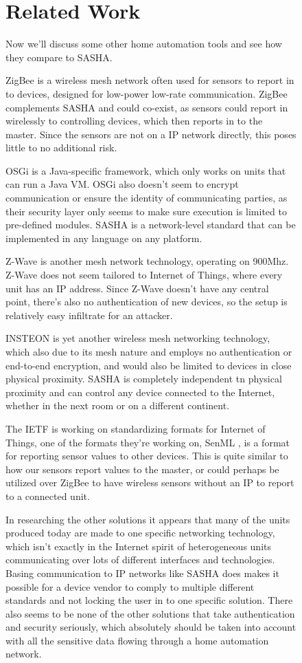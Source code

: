 \begin{figure}[H]
\section{Related Work}

Now we'll discuss some other home automation tools and see how they compare to SASHA.

ZigBee\cite{zigbee} is a wireless mesh network often used for sensors to report in to devices, designed for low-power low-rate communication. ZigBee complements SASHA and could co-exist, as sensors could report in wirelessly to controlling devices, which then reports in to the master. Since the sensors are not on a IP network directly, this poses little to no additional risk.

OSGi\cite{osgi} is a Java-specific framework, which only works on units that can run a Java VM. OSGi also doesn't seem to encrypt communication or ensure the identity of communicating parties, as their security layer only seems to make sure execution is limited to pre-defined modules. SASHA is a network-level standard that can be implemented in any language on any platform.

Z-Wave\cite{z-wave} is another mesh network technology, operating on 900Mhz. Z-Wave does not seem tailored to Internet of Things, where every unit has an IP address. Since Z-Wave doesn't have any central point, there's also no authentication of new devices, so the setup is relatively easy infiltrate for an attacker.

INSTEON is yet another wireless mesh networking technology, which also due to its mesh nature and employs no authentication or end-to-end encryption, and would also be limited to devices in close physical proximity. SASHA is completely independent tn physical proximity and can control any device connected to the Internet, whether in the next room or on a different continent.

The IETF is working on standardizing formats for Internet of Things, one of the formats they're working on, SenML \cite{senml}, is a format for reporting sensor values to other devices. This is quite similar to how our sensors report values to the master, or could perhaps be utilized over ZigBee to have wireless sensors without an IP to report to a connected unit.

In researching the other solutions it appears that many of the units produced today are made to one specific networking technology, which isn't exactly in the Internet spirit of heterogeneous units communicating over lots of different interfaces and technologies. Basing communication to IP networks like SASHA does makes it possible for a device vendor to comply to multiple different standards and not locking the user in to one specific solution. There also seems to be none of the other solutions that take authentication and security seriously, which absolutely should be taken into account with all the sensitive data flowing through a home automation network.


\end{figure}
